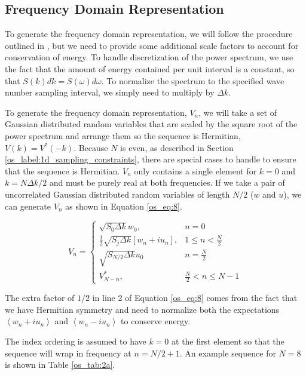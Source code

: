 \subsection {Frequency Domain Representation}
To generate the frequency domain representation, we will follow the procedure outlined in \cite{percival_spectra}, but we need to provide some additional scale factors to account for conservation of energy. To handle discretization of the power spectrum, we use the fact that the amount of energy contained per unit interval is a constant, so that $S(k)dk = S(\omega) d\omega$. To normalize the spectrum to the specified wave number sampling interval, we simply need to multiply by $\Delta k$.

To generate the frequency domain representation, $V_n$, we will take a set of Gaussian distributed random variables that are scaled  by the square root of the power spectrum and arrange them so the sequence is Hermitian, $V(k) = V^*(-k)$. Because $N$ is even, as described in Section \ref{os_label:1d_sampling_constraints}, there are special cases to handle to ensure that the sequence is Hermitian. $V_n$ only contains a single element for $k = 0$ and $k = N\Delta k/2$ and must be purely real at both frequencies. If we take a pair of uncorrelated Gaussian distributed random variables of length $N/2$ ($w$ and $u$), we can generate $V_n$ as shown in Equation \ref{os_eq:8}.

\begin{equation}
  \label{os_eq:8}   
  V_n = \begin{cases}
    \sqrt{S_0\Delta k}w_0, & n = 0 \\
    \frac{1}{2}\sqrt{S_j\Delta k}\left[w_n + iu_n \right], & 1 \leq n < \frac{N}{2} \\
   \sqrt{S_{N/2}\Delta k}u_0 & n = \frac{N}{2} \\
    V_{N-n}^*, &  \frac{N}{2} < n \leq N-1 
  \end{cases} 
\end{equation}
\renewcommand{\baselinestretch}{2} \small\normalsize

The extra factor of $1/2$ in line 2 of Equation \ref{os_eq:8} comes from the fact that we have Hermitian symmetry and need to normalize both the expectations $\left<w_n + iu_n\right>$ and $\left<w_n - iu_n\right>$ to conserve energy.

The index ordering is assumed to have $k=0$ at the first element so that the sequence will wrap in frequency at $n = N/2 + 1$. An example sequence for $N = 8$ is shown in Table \ref{os_tab:2a}.


